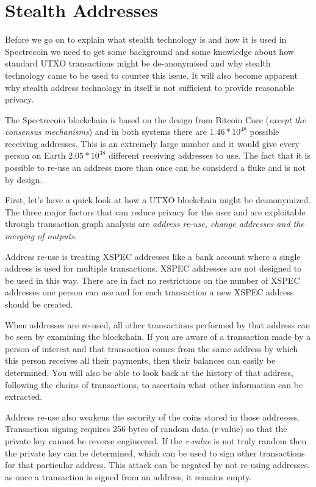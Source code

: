 \section{Stealth Addresses}
Before we go on to explain what stealth technology is and how it is used in
Spectrecoin we need to get some background and some knowledge about how
standard UTXO transactions might be de-anonymised and why stealth technology
came to be used to counter this issue. It will also become apparent why
stealth address technology in itself is not sufficient to provide reasonable
privacy.



The Spectrecoin blockchain is based on the design from Bitcoin Core 
(\textit{except the consensus mechanisms}) and in both systems there are 
$1.46 \ast 10^{48}$ possible receiving addresses. This is an extremely 
large number and it would give every person on Earth $2.05 \ast 10^{38}$ 
different receiving addresses to use. The fact that it is possible
to re-use an address more than once can be considerd a fluke and is not by
design.



First, let’s have a quick look at how a UTXO blockchain might be deanonymized.
The three major factors that can reduce privacy for the user and are exploitable
through transaction graph analysis are \textit{address re-use, change addresses 
and the merging of outputs}.



Address re-use is treating XSPEC addresses like a bank account where a single
address is used for multiple transactions. XSPEC addresses are not designed to
be used in this way. There are in fact no restrictions on the number of XSPEC
addresses one person can use and for each transaction a new XSPEC address should
be created.



When addresses are re-used, all other transactions performed by that address
can be seen by examining the blockchain. If you are aware of a transaction
made by a person of interest and that transaction comes from the same address
by which this person receives all their payments, then their balances can
easily be determined. You will also be able to look back at the history of
that address, following the chains of transactions, to ascertain what other
information can be extracted.



Address re-use also weakens the security of the coins stored in those addresses.
Transaction signing requires 256 bytes of random data (r-value) so that the
private key cannot be reverse engineered. If the \textit{r-value} is not truly random
then the private key can be determined, which can be used to sign other
transactions for that particular address. This attack can be negated by
not re-using addresses, as once a transaction is signed from an address,
it remains empty.



